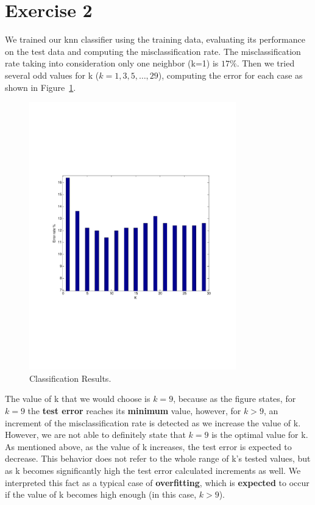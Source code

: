 \documentclass[letterpaper,11pt]{article}
\begin{document}
\section*{Exercise 2}
We trained our knn classifier using the training data, evaluating its performance on the test data and computing the misclassification rate. The misclassification rate taking into consideration only one neighbor (k=1) is $17\%$. Then we tried several odd values for k ($k=1, 3, 5, \ldots, 29$), computing the error for each case as shown in Figure~\ref{fig:3}.


  \begin{figure}[h!]
\centering
  \includegraphics[trim = 0cm 7cm 0cm 7cm, clip, width=0.8\textwidth]{figures/KnnResults.pdf}
  \caption{Classification Results.}
  \label{fig:3}
\end{figure}

The value of k that we would choose is \textbf{$k=9$}, because as the figure states, for $k=9$ the \textbf{test error} reaches its \textbf{minimum} value, however, for $k>9$, an increment of the misclassification rate is detected as we increase the value of k. However, we are not able to definitely state that $k=9$ is the optimal value for k. As mentioned above, as the value of k increases, the test error is expected to decrease. This behavior does not refer to the whole range of k's tested values, but as k becomes significantly high the test error calculated increments as well. We interpreted this fact as a typical case of \textbf{overfitting}, which is \textbf{expected} to occur if the value of k becomes high enough (in this case, $k>9$).
\end{document}
